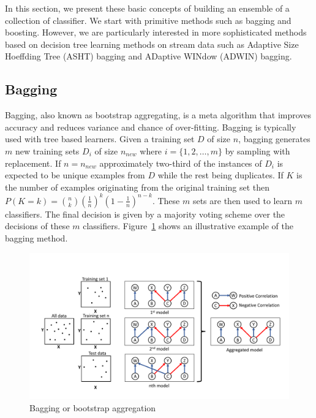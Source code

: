 In this section, we present these basic concepts of building an ensemble of a collection of classifier. We start with primitive methods such as bagging and boosting. However, we are particularly interested in more sophisticated methods based on decision tree learning methods on stream data such as Adaptive Size Hoeffding Tree (ASHT) bagging and ADaptive WINdow (ADWIN) bagging.

\subsection{Bagging}
\label{sec:bg:bagging}
Bagging, also known as bootstrap aggregating, is a meta algorithm that improves accuracy and reduces variance and chance of over-fitting. Bagging is typically used with tree based learners. Given a training set $D$ of size $n$, bagging generates $m$ new training sets $D_i$ of size $n_{new}$ where $i = \{1, 2, \dots, m\}$ by sampling with replacement. If $n = n_{new}$ approximately two-third of the instances of $D_i$ is expected to be unique examples from $D$ while the rest being duplicates. If $K$ is the number of examples originating from the original training set then $P(K=k) = \binom{n}{k} \left( \frac{1}{n}\right)^k \left(1- \frac{1}{n}\right)^{n-k}$. These $m$ sets are then used to learn $m$ classifiers. The final decision is given by a majority voting scheme over the decisions of these $m$ classifiers. Figure~\ref{fig:bg:bagging} shows an illustrative example of the bagging method.
\begin{figure}[htbp]
    \begin{center}
        \includegraphics[width=14.0cm]{figs/bagging.pdf}
        \caption{Bagging or bootstrap aggregation}
        \label{fig:bg:bagging}
    \end{center}
\end{figure}

